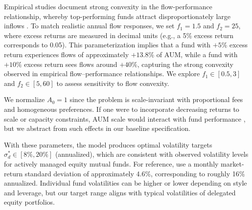 Empirical studies document strong convexity in the flow-performance relationship, whereby top-performing funds attract disproportionately large inflows \citep[][]{sirri1998costly, ferreira2012flow}. To match realistic annual flow responses, we set $f_1=1.5$ and $f_2=25$, where excess returns are measured in decimal units (e.g., a 5\% excess return corresponds to 0.05). This parameterization implies that a fund with \(+5\%\) excess return experiences flows of approximately \(+13.8\%\) of AUM, while a fund with \(+10\%\) excess return sees flows around \(+40\%\), capturing the strong convexity observed in empirical flow--performance relationships. We explore \(f_1\in[0.5,3]\) and \(f_2\in[5,60]\) to assess sensitivity to flow convexity.

We normalize \(A_0=1\) since the problem is scale-invariant with proportional fees and homogeneous preferences. If one were to incorporate decreasing returns to scale or capacity constraints, AUM scale would interact with fund performance \citep[][]{berk2004mutual}, but we abstract from such effects in our baseline specification.

With these parameters, the model produces optimal volatility targets \(\sigma_d^*\in[8\%,20\%]\) (annualized), which are consistent with observed volatility levels for actively managed equity mutual funds. For reference, \citet[][]{barras2010false} use a monthly market-return standard deviation of approximately 4.6\%, corresponding to roughly 16\% annualized. Individual fund volatilities can be higher or lower depending on style and leverage, but our target range aligns with typical volatilities of delegated equity portfolios.
